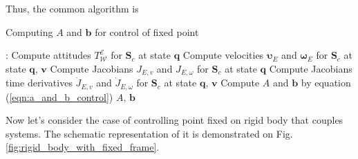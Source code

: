 Thus, the common algorithm is

\begin{breakablealgorithm}
    \caption{Computing $A$ and $\mathbf{b}$ for control of fixed point}

    \begin{algorithmic}[1]
         : 
        \State Compute attitudes $T_{\mathcal{W}}^{\mathcal{E}}$ for $\mathbf{S}_c$ 
        at state $\mathbf{q}$
        \State Compute velocities $\boldsymbol{\upsilon}_E$ and 
        $\boldsymbol{\omega}_E$ for $\mathbf{S}_c$ at state $\mathbf{q}$, 
        $\mathbf{v}$
        \State Compute Jacobians $J_{E,v}$ and $J_{E, \omega}$ for $\mathbf{S}_c$ 
        at state $\mathbf{q}$
        \State Compute Jacobians time derivatives $\dot{J}_{E,v}$ and 
        $\dot{J}_{E, \omega}$ for $\mathbf{S}_c$ at state $\mathbf{q}$, $\mathbf{v}$
        \State Compute $A$ and $\mathbf{b}$ by equation (\ref{eqn:a_and_b_control})
        \State \Return $A$, $\mathbf{b}$
        \EndFunction
    \end{algorithmic}
    \label{alg:get_a_and_b_control_fixed}
\end{breakablealgorithm}

Now let's consider the case of controlling point fixed on rigid body that couples 
systems. The schematic representation of it is demonstrated on Fig. 
\ref{fig:rigid_body_with_fixed_frame}.

